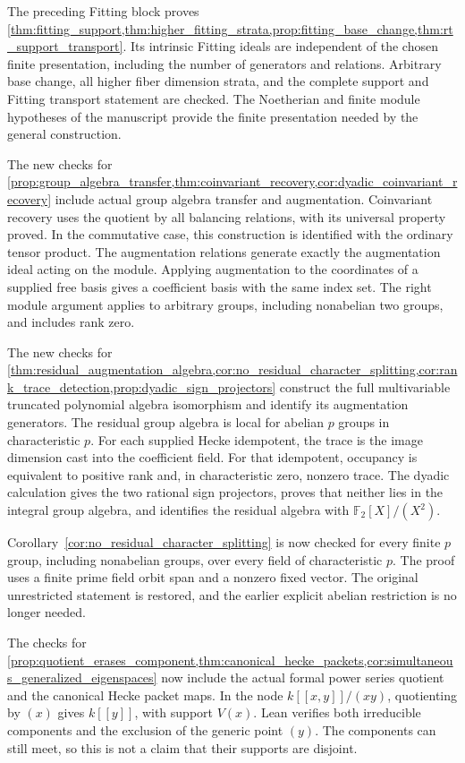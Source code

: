 \documentclass[11pt]{amsart}
\theoremstyle{definition}
\theoremstyle{remark}
\newcommand{\FF}{\mathbb F}
\begin{document}
The preceding Fitting block proves \cref{thm:fitting_support,thm:higher_fitting_strata,prop:fitting_base_change,thm:rt_support_transport}. Its intrinsic Fitting ideals are independent of the chosen finite presentation, including the number of generators and relations. Arbitrary base change, all higher fiber dimension strata, and the complete support and Fitting transport statement are checked. The Noetherian and finite module hypotheses of the manuscript provide the finite presentation needed by the general construction.

The new checks for \cref{prop:group_algebra_transfer,thm:coinvariant_recovery,cor:dyadic_coinvariant_recovery} include actual group algebra transfer and augmentation. Coinvariant recovery uses the quotient by all balancing relations, with its universal property proved. In the commutative case, this construction is identified with the ordinary tensor product. The augmentation relations generate exactly the augmentation ideal acting on the module. Applying augmentation to the coordinates of a supplied free basis gives a coefficient basis with the same index set. The right module argument applies to arbitrary groups, including nonabelian two groups, and includes rank zero.

The new checks for \cref{thm:residual_augmentation_algebra,cor:no_residual_character_splitting,cor:rank_trace_detection,prop:dyadic_sign_projectors} construct the full multivariable truncated polynomial algebra isomorphism and identify its augmentation generators. The residual group algebra is local for abelian \(p\) groups in characteristic \(p\). For each supplied Hecke idempotent, the trace is the image dimension cast into the coefficient field. For that idempotent, occupancy is equivalent to positive rank and, in characteristic zero, nonzero trace. The dyadic calculation gives the two rational sign projectors, proves that neither lies in the integral group algebra, and identifies the residual algebra with \(\FF_2[X]/(X^2)\).

Corollary~\ref{cor:no_residual_character_splitting} is now checked for every finite \(p\) group, including nonabelian groups, over every field of characteristic \(p\). The proof uses a finite prime field orbit span and a nonzero fixed vector. The original unrestricted statement is restored, and the earlier explicit abelian restriction is no longer needed.

The checks for \cref{prop:quotient_erases_component,thm:canonical_hecke_packets,cor:simultaneous_generalized_eigenspaces} now include the actual formal power series quotient and the canonical Hecke packet maps. In the node \(k[[x,y]]/(xy)\), quotienting by \((x)\) gives \(k[[y]]\), with support \(V(x)\). Lean verifies both irreducible components and the exclusion of the generic point \((y)\). The components can still meet, so this is not a claim that their supports are disjoint.
\end{document}
